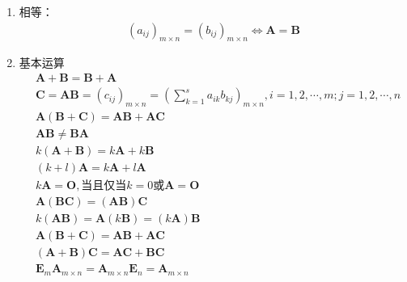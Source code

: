\documentclass[12pt]{book}
\begin{document}
\begin{enumerate}[1.]
    \item 相等：
          \begin{gather*}
              (a_{ij})_{m\times n} = (b_{ij})_{m\times n} \Leftrightarrow \mathbf{A}=\mathbf{B}
          \end{gather*}
    \item 基本运算
          \begin{align*}
               & \mathbf{A}+\mathbf{B} = \mathbf{B} + \mathbf{A}                                                                                \\
               & \bm{C}=\bm{AB} = (c_{ij})_{m\times n} = \left( \sum_{k=1}^{s}{a_{ik}b_{kj}} \right)_{m\times n}, i=1,2,\cdots,m;j=1,2,\cdots,n \\
               & \mathbf{A}(\mathbf{B}+\mathbf{C}) = \mathbf{A}\mathbf{B}+\mathbf{A}\mathbf{C}                                                  \\
               & \mathbf{A}\mathbf{B} \neq \mathbf{B}\mathbf{A}                                                                                 \\
               & k(\bm{A}+\bm{B})=k\bm{A}+k\bm{B}                                                                                               \\
               & (k+l)\bm{A} = k\bm{A}+l\bm{A}                                                                                                  \\
               & k\bm{A}=\bm{O}, \text{当且仅当}k=0\text{或}\bm{A}=\bm{O}                                                                       \\
               & \bm{A}(\bm{BC}) = (\bm{AB})\bm{C}                                                                                              \\
               & k(\bm{AB}) = \bm{A}(k\bm{B}) = (k\bm{A})\bm{B}                                                                                 \\
               & \bm{A}(\bm{B}+\bm{C}) = \bm{AB}+\bm{AC}                                                                                        \\
               & (\bm{A}+\bm{B})\bm{C} = \bm{AC}+\bm{BC}                                                                                        \\
               & \bm{E}_{m} \bm{A}_{m\times n} = \bm{A}_{m\times n}\bm{E}_{n}    =  \bm{A}_{m\times n}                                          \\

\end{align*}
\end{enumerate}
\end{document}
